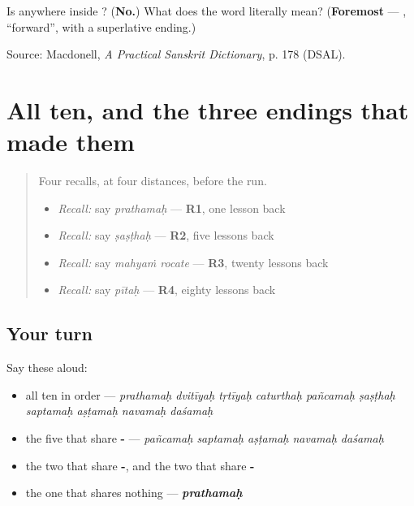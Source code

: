 \begin{tcolorbox}[breakable,colback=teal!4,colframe=teal!35!black,title={Before you move on}]
Is \textbf{} anywhere inside \textbf{}? (\textbf{No.}) What does the word literally mean? (\textbf{Foremost} — \textbf{}, \textquotedblleft{}forward\textquotedblright{}, with a superlative ending.)

Source: Macdonell, \emph{A Practical Sanskrit Dictionary}, p. 178 (DSAL).
\end{tcolorbox}
\section[\texorpdfstring{\sk{प्रथमः} · \sk{द्वितीयः} … (prathamaḥ …)}{प्रथमः · द्वितीयः … (prathamaḥ …)}]{All ten, and the three endings that made them}

\label{lesson:SA-R63-all-ten}



\begin{quote}
Four recalls, at four distances, before the run.

\begin{itemize}
\raggedright
  \item \emph{Recall:} say \emph{prathamaḥ} — \textbf{R1}, one lesson back
  \item \emph{Recall:} say \emph{ṣaṣṭhaḥ} — \textbf{R2}, five lessons back
  \item \emph{Recall:} say \emph{mahyaṁ rocate} — \textbf{R3}, twenty lessons back
  \item \emph{Recall:} say \emph{pītaḥ} — \textbf{R4}, eighty lessons back
\end{itemize}
\end{quote}

\subsection*{Your turn}
Say these aloud:

\begin{itemize}
\raggedright
  \item all ten in order — \emph{prathamaḥ dvitīyaḥ tṛtīyaḥ caturthaḥ pañcamaḥ ṣaṣṭhaḥ saptamaḥ aṣṭamaḥ navamaḥ daśamaḥ}
  \item the five that share \textbf{-} — \emph{pañcamaḥ saptamaḥ aṣṭamaḥ navamaḥ daśamaḥ}
  \item the two that share \textbf{-}, and the two that share \textbf{-}
  \item the one that shares nothing — \emph{\textbf{prathamaḥ}}
\end{itemize}

